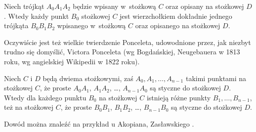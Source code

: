 \begin{theorem}
	Niech trójkąt $A_0 A_1 A_2$ będzie wpisany w~stożkową $C$ oraz opisany na stożkowej $D$.
	Wtedy każdy punkt $B_0$ stożkowej $C$ jest wierzchołkiem dokładnie jednego trójkąta $B_0 B_1 B_2$ wpisanego w~stożkową $C$ oraz opisanego na stożkowej $D$.
\end{theorem}

Oczywiście jest też wielkie twierdzenie Ponceleta, udowodnione przez, jak niezbyt trudno się domyślić, Victora Ponceleta \cite[s. 311-317]{poncelet_1865} (wg Bogdańskiej, Neugebauera w 1813 roku, wg angielskiej Wikipedii w 1822 roku).
%

\begin{theorem}
	Niech $C$ i $D$ będą dwiema stożkowymi, zaś $A_0, A_1, \ldots, A_{n-1}$ takimi punktami na stożkowej $C$, że proste $A_0A_1$, $A_1A_2$, \ldots, $A_{n-1}A_0$ są styczne do stożkowej $D$.
	Wtedy dla każdego punktu $B_0$ na stożkowej $C$ istnieją różne punkty $B_1, \ldots, B_{n-1}$, też na stożkowej $C$, że proste $B_0B_1$, $B_1B_2$, \ldots, $B_{n-1}B_0$ są styczne do stożkowej $D$.
\end{theorem}

Dowód można znaleźć na przykład u Akopiana, Zasławskiego \cite[s. 93, 61, 67, 115, 124]{akopyan_2007}.